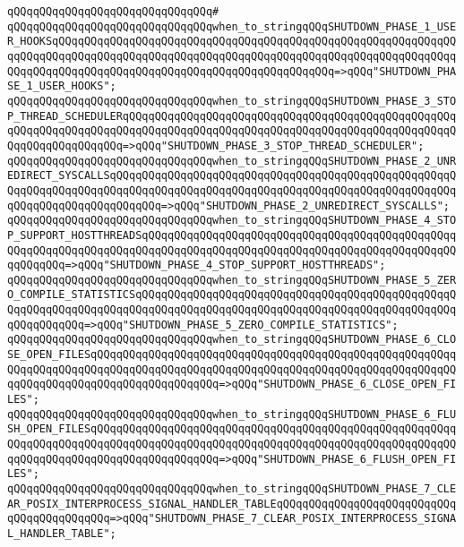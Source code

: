 \verb|qQQqqQQqqQQqqQQqqQQqqQQqqQQqqQQq#|\newline
\verb|qQQqqQQqqQQqqQQqqQQqqQQqqQQqqQQqwhen_to_stringqQQqSHUTDOWN_PHASE_1_USER_HOOKSqQQqqQQqqQQqqQQqqQQqqQQqqQQqqQQqqQQqqQQqqQQqqQQqqQQqqQQqqQQqqQQqqQQqqQQqqQQqqQQqqQQqqQQqqQQqqQQqqQQqqQQqqQQqqQQqqQQqqQQqqQQqqQQqqQQqqQQqqQQqqQQqqQQqqQQqqQQqqQQqqQQqqQQqqQQqqQQqqQQqqQQq=>qQQq"SHUTDOWN_PHASE_1_USER_HOOKS";|\newline
\verb|qQQqqQQqqQQqqQQqqQQqqQQqqQQqqQQqwhen_to_stringqQQqSHUTDOWN_PHASE_3_STOP_THREAD_SCHEDULERqQQqqQQqqQQqqQQqqQQqqQQqqQQqqQQqqQQqqQQqqQQqqQQqqQQqqQQqqQQqqQQqqQQqqQQqqQQqqQQqqQQqqQQqqQQqqQQqqQQqqQQqqQQqqQQqqQQqqQQqqQQqqQQqqQQqqQQqqQQq=>qQQq"SHUTDOWN_PHASE_3_STOP_THREAD_SCHEDULER";|\newline
\verb|qQQqqQQqqQQqqQQqqQQqqQQqqQQqqQQqwhen_to_stringqQQqSHUTDOWN_PHASE_2_UNREDIRECT_SYSCALLSqQQqqQQqqQQqqQQqqQQqqQQqqQQqqQQqqQQqqQQqqQQqqQQqqQQqqQQqqQQqqQQqqQQqqQQqqQQqqQQqqQQqqQQqqQQqqQQqqQQqqQQqqQQqqQQqqQQqqQQqqQQqqQQqqQQqqQQqqQQqqQQqqQQq=>qQQq"SHUTDOWN_PHASE_2_UNREDIRECT_SYSCALLS";|\newline
\verb|qQQqqQQqqQQqqQQqqQQqqQQqqQQqqQQqwhen_to_stringqQQqSHUTDOWN_PHASE_4_STOP_SUPPORT_HOSTTHREADSqQQqqQQqqQQqqQQqqQQqqQQqqQQqqQQqqQQqqQQqqQQqqQQqqQQqqQQqqQQqqQQqqQQqqQQqqQQqqQQqqQQqqQQqqQQqqQQqqQQqqQQqqQQqqQQqqQQqqQQqqQQqqQQq=>qQQq"SHUTDOWN_PHASE_4_STOP_SUPPORT_HOSTTHREADS";|\newline
\verb|qQQqqQQqqQQqqQQqqQQqqQQqqQQqqQQqwhen_to_stringqQQqSHUTDOWN_PHASE_5_ZERO_COMPILE_STATISTICSqQQqqQQqqQQqqQQqqQQqqQQqqQQqqQQqqQQqqQQqqQQqqQQqqQQqqQQqqQQqqQQqqQQqqQQqqQQqqQQqqQQqqQQqqQQqqQQqqQQqqQQqqQQqqQQqqQQqqQQqqQQqqQQqqQQq=>qQQq"SHUTDOWN_PHASE_5_ZERO_COMPILE_STATISTICS";|\newline
\verb|qQQqqQQqqQQqqQQqqQQqqQQqqQQqqQQqwhen_to_stringqQQqSHUTDOWN_PHASE_6_CLOSE_OPEN_FILESqQQqqQQqqQQqqQQqqQQqqQQqqQQqqQQqqQQqqQQqqQQqqQQqqQQqqQQqqQQqqQQqqQQqqQQqqQQqqQQqqQQqqQQqqQQqqQQqqQQqqQQqqQQqqQQqqQQqqQQqqQQqqQQqqQQqqQQqqQQqqQQqqQQqqQQqqQQqqQQq=>qQQq"SHUTDOWN_PHASE_6_CLOSE_OPEN_FILES";|\newline
\verb|qQQqqQQqqQQqqQQqqQQqqQQqqQQqqQQqwhen_to_stringqQQqSHUTDOWN_PHASE_6_FLUSH_OPEN_FILESqQQqqQQqqQQqqQQqqQQqqQQqqQQqqQQqqQQqqQQqqQQqqQQqqQQqqQQqqQQqqQQqqQQqqQQqqQQqqQQqqQQqqQQqqQQqqQQqqQQqqQQqqQQqqQQqqQQqqQQqqQQqqQQqqQQqqQQqqQQqqQQqqQQqqQQqqQQqqQQq=>qQQq"SHUTDOWN_PHASE_6_FLUSH_OPEN_FILES";|\newline
\verb|qQQqqQQqqQQqqQQqqQQqqQQqqQQqqQQqwhen_to_stringqQQqSHUTDOWN_PHASE_7_CLEAR_POSIX_INTERPROCESS_SIGNAL_HANDLER_TABLEqQQqqQQqqQQqqQQqqQQqqQQqqQQqqQQqqQQqqQQqqQQq=>qQQq"SHUTDOWN_PHASE_7_CLEAR_POSIX_INTERPROCESS_SIGNAL_HANDLER_TABLE";|\newline
